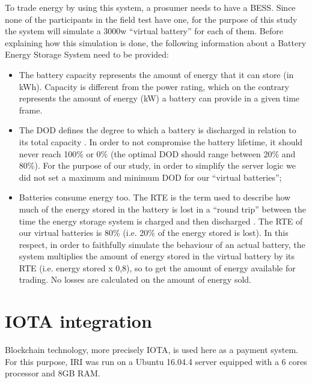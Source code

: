 To trade energy by using this system, a prosumer needs to have a BESS. Since none of the participants in the field test have one, for the purpose of this study the system will simulate a 3000w “virtual battery” for each of them. Before explaining how this simulation is done, the following  information about a Battery Energy Storage System need to be provided:
\begin{itemize}
    \item The battery capacity represents the amount of energy that it can store (in kWh). Capacity is different from the power rating, which on the contrary represents the amount of energy (kW) a battery can provide in a given time frame.
    \item The \ac{DOD} defines the degree to which a battery is discharged in relation to its total capacity . In order to not compromise the battery lifetime, it should never reach 100\% or 0\% (the optimal \ac{DOD} should range between 20\% and 80\%). For the purpose of our study, in order to simplify the server logic we did not set a maximum and minimum \ac{DOD} for our “virtual batteries”;
    \item Batteries consume energy too. The \ac{RTE} is the term used to describe how much of the energy stored in the battery is lost in a “round trip” between the time the energy storage system is charged and then discharged \cite{energymag}. The \ac{RTE} of our virtual batteries is 80\% (i.e. 20\% of the energy stored is lost).
In this respect, in order to faithfully simulate the behaviour of an actual battery, the system  multiplies the amount of energy stored in the virtual battery by its \ac{RTE} (i.e. energy stored x 0,8), so to get the amount of energy available for trading. No losses are calculated on the amount of energy sold.  
\end{itemize}
\section{IOTA integration} \label{ii}
Blockchain technology, more precisely IOTA, is used here as a payment system. For this purpose, \ac{IRI} was run on a Ubuntu 16.04.4 server equipped with a 6 cores processor and 8GB RAM.



